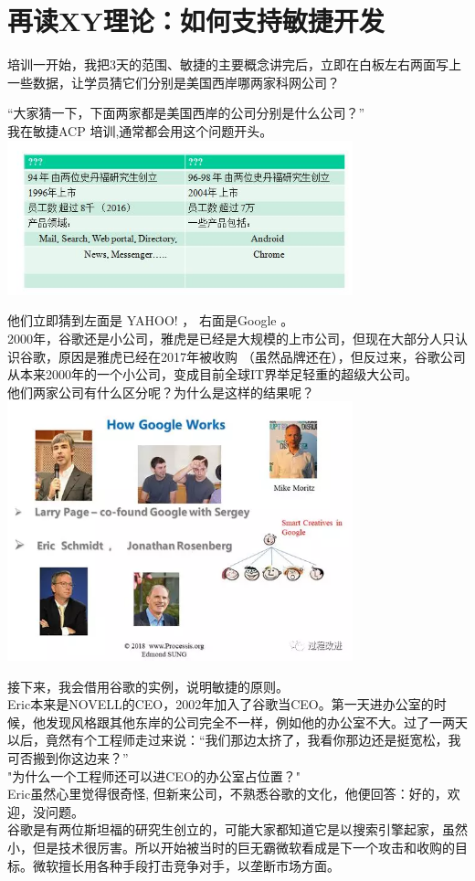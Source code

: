 \chapter[敏捷开发]{再读XY理论：如何支持敏捷开发}

培训一开始，我把3天的范围、敏捷的主要概念讲完后，立即在白板左右两面写上一些数据，让学员猜它们分别是美国西岸哪两家科网公司？

``大家猜一下，下面两家都是美国西岸的公司分别是什么公司？''\\
我在敏捷ACP 培训,通常都会用这个问题开头。\\

\includegraphics[width=10cm]{0A_Agile_stories_p4.jpg}

他们立即猜到左面是 YAHOO! ， 右面是Google 。\\
2000年，谷歌还是小公司，雅虎是已经是大规模的上市公司，但现在大部分人只认识谷歌，原因是雅虎已经在2017年被收购
（虽然品牌还在），但反过来，谷歌公司从本来2000年的一个小公司，变成目前全球IT界举足轻重的超级大公司。\\
他们两家公司有什么区分呢？为什么是这样的结果呢？\\

\includegraphics[width=10cm]{香港敏捷2.jpg}

接下来，我会借用谷歌的实例，说明敏捷的原则。\\
Eric本来是NOVELL的CEO，2002年加入了谷歌当CEO。第一天进办公室的时候，他发现风格跟其他东岸的公司完全不一样，例如他的办公室不大。过了一两天以后，竟然有个工程师走过来说：``我们那边太挤了，我看你那边还是挺宽松，我可否搬到你这边来？''\\
"为什么一个工程师还可以进CEO的办公室占位置？"\\
Eric虽然心里觉得很奇怪,
但新来公司，不熟悉谷歌的文化，他便回答：好的，欢迎，没问题。\\
谷歌是有两位斯坦福的研究生创立的，可能大家都知道它是以搜索引擎起家，虽然小，但是技术很厉害。所以开始被当时的巨无霸微软看成是下一个攻击和收购的目标。微软擅长用各种手段打击竞争对手，以垄断市场方面。

